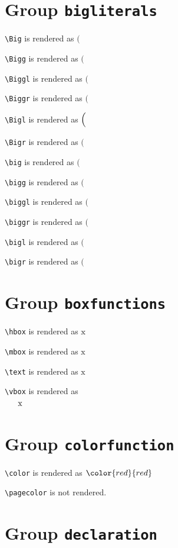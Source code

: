\section{ Group \texttt{big\textunderscore literals}}

\texttt{\textbackslash Big} is rendered as $\Big($

\texttt{\textbackslash Bigg} is rendered as $\Bigg($

\texttt{\textbackslash Biggl} is rendered as $\Biggl($

\texttt{\textbackslash Biggr} is rendered as $\Biggr($

\texttt{\textbackslash Bigl} is rendered as $\Bigl($

\texttt{\textbackslash Bigr} is rendered as $\Bigr($

\texttt{\textbackslash big} is rendered as $\big($

\texttt{\textbackslash bigg} is rendered as $\bigg($

\texttt{\textbackslash biggl} is rendered as $\biggl($

\texttt{\textbackslash biggr} is rendered as $\biggr($

\texttt{\textbackslash bigl} is rendered as $\bigl($

\texttt{\textbackslash bigr} is rendered as $\bigr($

\section{ Group \texttt{box\textunderscore functions}}

\texttt{\textbackslash hbox} is rendered as $\hbox{x}$

\texttt{\textbackslash mbox} is rendered as $\mbox{x}$

\texttt{\textbackslash text} is rendered as $\text{x}$

\texttt{\textbackslash vbox} is rendered as $\vbox{x}$

\section{ Group \texttt{color\textunderscore function}}

\texttt{\textbackslash color} is rendered as $\color{red}{red}$

\texttt{\textbackslash pagecolor} is not rendered.

\section{ Group \texttt{declaration}}

